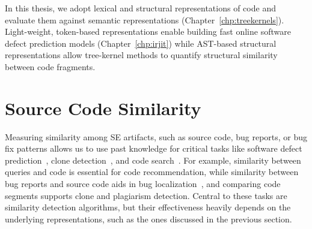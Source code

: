 \documentclass[\main/thesis.tex]{subfiles}
\begin{document}





In this thesis, we adopt lexical and structural representations of code and evaluate them against semantic representations (Chapter~\ref{chp:treekernels}). Light-weight, token-based representations enable building fast online software defect prediction models (Chapter~\ref{chp:irjit}) while AST-based  structural representations allow tree-kernel methods to quantify structural similarity between code fragments.

\section{Source Code Similarity}
\label{sec:similarity}

Measuring similarity among SE artifacts, such as source code, bug reports, or bug fix patterns allows us to use past knowledge for critical tasks like software defect prediction~\cite{clever}, clone detection~\cite{roy2007survey}, and code search~\cite{facoy}. For example, similarity between queries and code is essential for code recommendation, while similarity between bug reports and source code aids in bug localization~\cite{rahman2018improving}, and comparing code segments supports clone and plagiarism detection. Central to these tasks are similarity detection algorithms, but their effectiveness heavily depends on the underlying representations, such as the ones discussed in the previous section.
\end{document}
